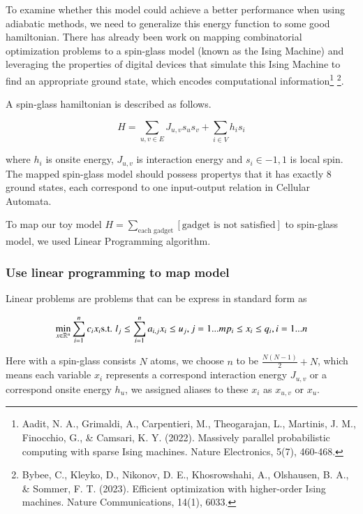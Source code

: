 \documentclass[twocolumn,superscriptaddress,english,showpacs,longbibliography]{revtex4-2}
\begin{document}
To examine whether this model could achieve a better performance when
using adiabatic methods, we need to generalize this energy function to
some good hamiltonian. There has already been work on mapping
combinatorial optimization problems to a spin-glass model (known as the
Ising Machine) and leveraging the properties of digital devices that
simulate this Ising Machine to find an appropriate ground state, which
encodes computational information\footnote{Aadit, N. A., Grimaldi, A.,
  Carpentieri, M., Theogarajan, L., Martinis, J. M., Finocchio, G., \&
  Camsari, K. Y. (2022). Massively parallel probabilistic computing with
  sparse Ising machines. Nature Electronics, 5(7), 460-468.}
\footnote{Bybee, C., Kleyko, D., Nikonov, D. E., Khosrowshahi, A.,
  Olshausen, B. A., \& Sommer, F. T. (2023). Efficient optimization with
  higher-order Ising machines. Nature Communications, 14(1), 6033.}.

A spin-glass hamiltonian is described as follows.

\[
H = \sum_{u,v \in E} J_{u,v}s_us_v + \sum_{i\in V}h_i s_i
\]

where $h_i$ is onsite energy, $J_{u,v}$ is interaction energy and
$s_i \in {-1, 1}$ is local spin. The mapped spin-glass model should
possess propertys that it has exactly 8 ground states, each correspond
to one input-output relation in Cellular Automata.

To map our toy model
$H = \sum_{\text{each gadget}} [\text{gadget is not satisfied}]$ to
spin-glass model, we used Linear Programming algorithm.

\subsubsection{Use linear programming to map
model}\label{use-linear-programming-to-map-model}

Linear problems are problems that can be express in standard form as

\[
\min_{x \in \mathbb{R}^n} \sum_{i=1}^n c_ix_i\\
\text{s.t. } l_j \leq \sum_{i=1}^n a_{i,j}x_i \leq u_j, j=1...m\\
p_i \leq x_i \leq q_i, i=1...n
\]

Here with a spin-glass consists $N$ atoms, we choose $n$ to be
$\frac{N(N-1)}{2} + N$, which means each variable $x_i$ represents a
correspond interaction energy $J_{u, v}$ or a correspond onsite energy
$h_u$, we assigned aliases to these $x_i$ as $x_{u,v}$ or
$x_{u}$.
\end{document}

